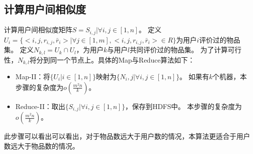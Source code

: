 \subsection{计算用户间相似度}
计算用户间相似度矩阵$S={S_{i,j}|\forall i,j\in[1,n]}$。
定义$U_i = \{<i,j,r_{i,j},\bar{r}_i>|\forall j \in [1,m],<i,j,r_{i,j},\bar{r}_i>\in R\}$为用户$i$评价过的物品集。
定义$N_{k,l} = U_k \cap U_l$，为用户$k$与用户$l$共同评价过的物品集。
为了计算可行性，$N_{k,l}$将分到同一个节点上。具体的Map与Reduce算法如下：
\begin{itemize}
\item Map-II：将$\{U_i|i\in [1,n]\}$映射为$\{N_i,j|\forall i,j\in [1,n]\}$。
如果有$k$个机器，本步骤的复杂度为$o(\frac{m^2n}{k})$。
\item Reduce-II：取出$\{S_{i,j}|\forall i,j\in [1,n]\}$，保存到HDFS中。
本步骤的复杂度为$o(\frac{m^2n}{k})$。
\end{itemize}
此步骤可以看出可以看出，对于物品数远大于用户数的情况，本算法更适合于用户数远大于物品数的情况。

